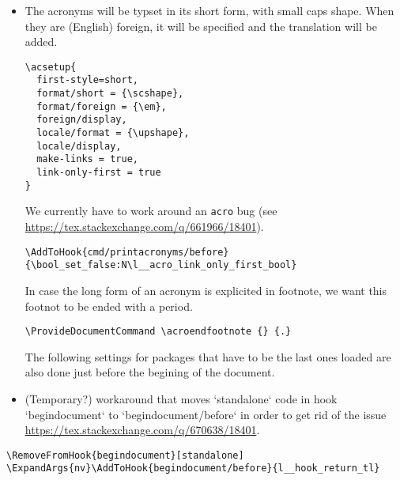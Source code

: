 \documentclass{letgut}
\begin{document}
\begin{itemize}
\begin{lstlisting}
  \phantomsection
  \__letgut_old_printbibliography[#1]
  \bool_if:NT \g__letgut_included_files_attached_bool {
    \seq_map_inline:Nn \g__letgut_added_bib_resources_seq {\seq_gput_right:Nn \g__letgut_included_files_seq {#1}}
  }
}
\end{lstlisting}
 For printing the bibliography, we define two new bibheadings for the
structure levels \lstinline+\title+ and \lstinline+\subtitle+.
\begin{lstlisting}
\defbibheading{title}[\refname]{%
  \title{#1}}
\defbibheading{subtitle}[\refname]{%
  \subtitle{#1}}
\end{lstlisting}
\item The acronyms will be typset in its short form, with small caps shape. When they are
(English) foreign, it will be specified and the translation will be added.
\begin{lstlisting}
\acsetup{
  first-style=short,
  format/short = {\scshape},
  format/foreign = {\em},
  foreign/display,
  locale/format = {\upshape},
  locale/display,
  make-links = true,
  link-only-first = true
}
\end{lstlisting}

We currently have to work around an \lstinline+acro+ bug (see \url{https://tex.stackexchange.com/q/661966/18401}).

\begin{lstlisting}
\AddToHook{cmd/printacronyms/before}{\bool_set_false:N\l__acro_link_only_first_bool}
\end{lstlisting}

In case the long form of an acronym is explicited in footnote, we want this
footnot to be ended with a period.
\begin{lstlisting}
\ProvideDocumentCommand \acroendfootnote {} {.}
\end{lstlisting}

The following settings for packages that have to be the last ones loaded are
also done just before the begining of the document.

\item (Temporary?) workaround that moves `standalone` code in hook `begindocument`
to `begindocument/before` in order to get rid of the issue
\url{https://tex.stackexchange.com/q/670638/18401}.
\end{itemize}

\begin{lstlisting}
\RemoveFromHook{begindocument}[standalone]
\ExpandArgs{nv}\AddToHook{begindocument/before}{l__hook_return_tl}
\end{lstlisting}
\end{document}
